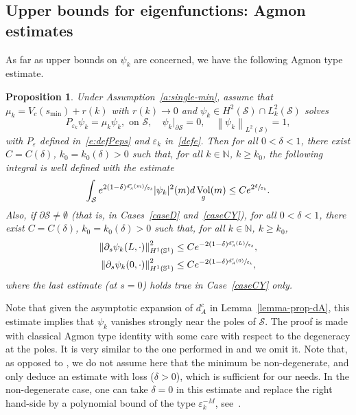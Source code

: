 \documentclass[11pt]{article}
\numberwithin{equation}{section}
\newtheorem{proposition}[lemma]{Proposition}
\theoremstyle{definition}
\newcommand{\calS}{\ensuremath{\mathcal S}}
\newcommand{\mb}[1]{\ensuremath{\mathbb{#1}}}
\newcommand{\N}{{\mb{N}}}
\newcommand{\bS}{\ensuremath{\mathbb S}}
\DeclareMathOperator{\Vol}{Vol}
\newcommand\nor[2]{\left\|#1\right\|_{#2}}
\newcommand{\ce}{c}
\let\d\partial
\let\e\varepsilon
\let\eps\varepsilon
\begin{document}
\subsection{Upper bounds for eigenfunctions: Agmon estimates}
\label{s:surf-Agmon}
As far as upper bounds on $\psi_k$ are concerned, we have the following Agmon type estimate.
\begin{proposition}
\label{p:Agmon-revolution}
Under Assumption~\ref{a:single-min}, assume that $\mu_k = V_\ce(s_{\min}) +r(k)$ with $r(k)\to 0$ and $\psi_k \in H^2 (\mathcal{S})\cap L^2_k(\calS)$ solves
\[
P_{\e_k}\psi_k=\mu_k \psi_k, \text{ on } \calS, \quad \psi_k|_{\d\calS} = 0,\quad \nor{\psi_k}{L^2(\calS)}=1,
\]
with $P_\eps$ defined in~\eqref{e:defPeps} and $\e_k$ in~\eqref{defe}. Then for all $0<\delta< 1$, there exist $C=C(\delta)$, $k_0=k_0(\delta)>0$ such that, for all $k \in \N$, $k \geq k_0$, the following integral is well defined with the estimate
\[
\int_{\calS} e^{2(1-\delta)\sfrac{ d_A^{\ce}(m)}{\e_k}} |\psi_k|^2(m) d\Vol_g(m)
\leq C e^{2\sfrac{\delta}{\e_k}}.
\]
Also, if $\d\calS \neq \emptyset$ (that is, in Cases~\ref{caseD} and~\ref{caseCY}), for all $0<\delta< 1$, there exist $C=C(\delta)$, $k_0=k_0(\delta)>0$ such that, for all $k \in \N$, $k \geq k_0$,
\begin{equation}
\label{e:estimate-psik-bord}
\begin{split}
\nor{\d_s \psi_k(L,\cdot)}{H^1(\bS^1)}^2
&\leq C e^{- 2(1-\delta)\sfrac{ d_A^{\ce}(L)}{\e_k}}, \\
\nor{\d_s \psi_k(0,\cdot)}{H^1(\bS^1)}^2
&\leq C e^{- 2(1-\delta)\sfrac{ d_A^{\ce}(0)}{\e_k}},
\end{split}
\end{equation}
where the last estimate (at $s=0$) holds true in Case~\ref{caseCY} only.
\end{proposition}
Note that given the asymptotic expansion of $d_A^{\ce}$ in Lemma~\ref{lemma-prop-dA}, this estimate implies that $\psi_k$ vanishes strongly near the poles of $\calS$.
The proof is made with classical Agmon type identity with some care with respect to the degeneracy at the poles. It is very similar to the one performed in \cite[Th.\,3.9]{LL:18} and we omit it. Note that, as opposed to \cite[Th.\,3.9]{LL:18}, we do not assume here that the minimum be non-degenerate, and only deduce an estimate with loss ($\delta>0$), which is sufficient for our needs. In the non-degenerate case, one can take $\delta=0$ in this estimate and replace the right hand-side by a polynomial bound of the type $\e_k^{-M}$, see~\cite[Th.\,3.9]{LL:18}.
\end{document}
